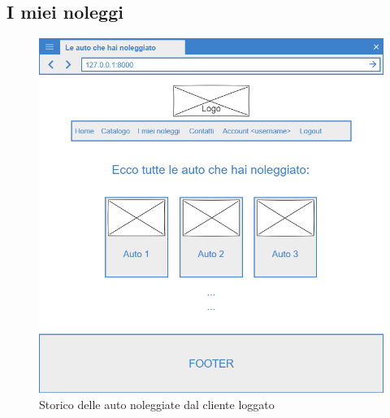 \documentclass[12pt,a4paperS]{report}
\begin{document}
\begin{normalsize}
			\subsection{I miei noleggi}
				\begin{figure}[H]
					\centering
					\includegraphics[width=1\textwidth, height=1\textheight, keepaspectratio]{Mockup/Storico_noleggi_utente.png}
					\caption{Storico delle auto noleggiate dal cliente loggato}
				\end{figure}
			

\end{normalsize}
\end{document}
